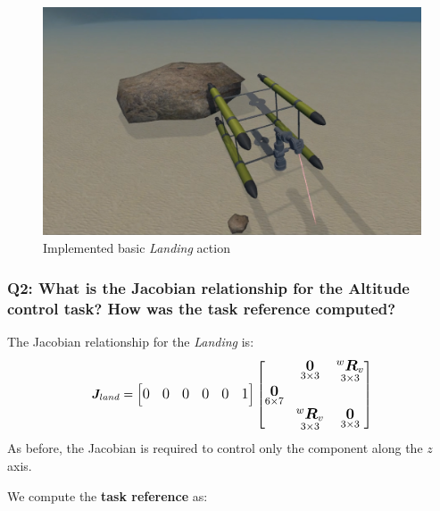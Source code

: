 \documentclass{article}
\begin{document}
\begin{figure}[h]
    \centering
    \includegraphics[scale=0.4]{211_Landing.png}
    \caption{Implemented basic \textit{Landing} action}
    \label{images_2_3_1}
\end{figure}

\subsubsection{Q2: What is the Jacobian relationship for the Altitude control task? How was the task reference computed?}

\noindent
\vspace{5px}
The Jacobian relationship for the \textit{Landing} is:
\begin{equation}
\large
\boldsymbol{J}_{land}=\begin{bmatrix} 0 & 0 & 0 & 0 & 0 & 1
\end{bmatrix}
    \begin{bmatrix}
     & \underset{3\times 3}{\boldsymbol{0}} & \underset{ 3\times 3}{^{w}\boldsymbol{R}_{v}} \\
     \underset{6\times 7}{\boldsymbol{0}} \\
     & \underset{ 3\times 3}{^{w}\boldsymbol{R}_{v}} & \underset{3\times 3}{\boldsymbol{0}} \\
    \end{bmatrix}
\end{equation}
As before, the Jacobian is required to control only the component along the $z$ axis.
 
\noindent
\vspace{5px}
We compute the \textbf{task reference} as:
\end{document}
